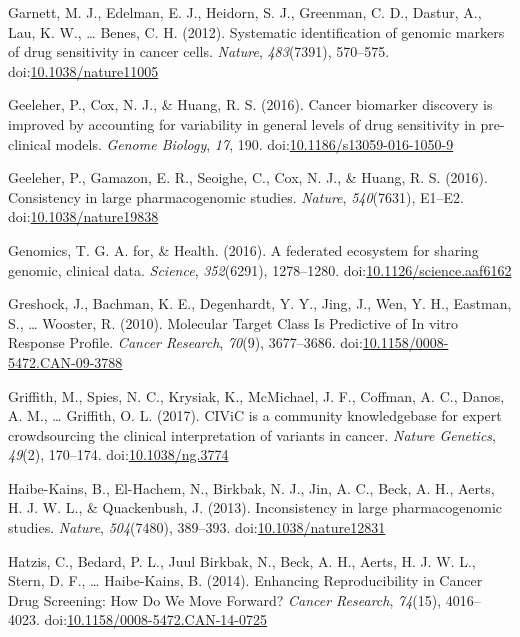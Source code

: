 \documentclass[man]{apa6}
\begin{document}
\hypertarget{ref-garnett2012}{}
Garnett, M. J., Edelman, E. J., Heidorn, S. J., Greenman, C. D., Dastur,
A., Lau, K. W., \ldots{} Benes, C. H. (2012). Systematic identification
of genomic markers of drug sensitivity in cancer cells. \emph{Nature},
\emph{483}(7391), 570--575.
doi:\href{https://doi.org/10.1038/nature11005}{10.1038/nature11005}

\hypertarget{ref-geeleher2016}{}
Geeleher, P., Cox, N. J., \& Huang, R. S. (2016). Cancer biomarker
discovery is improved by accounting for variability in general levels of
drug sensitivity in pre-clinical models. \emph{Genome Biology},
\emph{17}, 190.
doi:\href{https://doi.org/10.1186/s13059-016-1050-9}{10.1186/s13059-016-1050-9}

\hypertarget{ref-geeleher2016a}{}
Geeleher, P., Gamazon, E. R., Seoighe, C., Cox, N. J., \& Huang, R. S.
(2016). Consistency in large pharmacogenomic studies. \emph{Nature},
\emph{540}(7631), E1--E2.
doi:\href{https://doi.org/10.1038/nature19838}{10.1038/nature19838}

\hypertarget{ref-theglobalallianceforgenomicsandhealth2016}{}
Genomics, T. G. A. for, \& Health. (2016). A federated ecosystem for
sharing genomic, clinical data. \emph{Science}, \emph{352}(6291),
1278--1280.
doi:\href{https://doi.org/10.1126/science.aaf6162}{10.1126/science.aaf6162}

\hypertarget{ref-greshock2010}{}
Greshock, J., Bachman, K. E., Degenhardt, Y. Y., Jing, J., Wen, Y. H.,
Eastman, S., \ldots{} Wooster, R. (2010). Molecular Target Class Is
Predictive of In vitro Response Profile. \emph{Cancer Research},
\emph{70}(9), 3677--3686.
doi:\href{https://doi.org/10.1158/0008-5472.CAN-09-3788}{10.1158/0008-5472.CAN-09-3788}

\hypertarget{ref-griffith2017}{}
Griffith, M., Spies, N. C., Krysiak, K., McMichael, J. F., Coffman, A.
C., Danos, A. M., \ldots{} Griffith, O. L. (2017). CIViC is a community
knowledgebase for expert crowdsourcing the clinical interpretation of
variants in cancer. \emph{Nature Genetics}, \emph{49}(2), 170--174.
doi:\href{https://doi.org/10.1038/ng.3774}{10.1038/ng.3774}

\hypertarget{ref-haibe-kains2013}{}
Haibe-Kains, B., El-Hachem, N., Birkbak, N. J., Jin, A. C., Beck, A. H.,
Aerts, H. J. W. L., \& Quackenbush, J. (2013). Inconsistency in large
pharmacogenomic studies. \emph{Nature}, \emph{504}(7480), 389--393.
doi:\href{https://doi.org/10.1038/nature12831}{10.1038/nature12831}

\hypertarget{ref-hatzis2014}{}
Hatzis, C., Bedard, P. L., Juul Birkbak, N., Beck, A. H., Aerts, H. J.
W. L., Stern, D. F., \ldots{} Haibe-Kains, B. (2014). Enhancing
Reproducibility in Cancer Drug Screening: How Do We Move Forward?
\emph{Cancer Research}, \emph{74}(15), 4016--4023.
doi:\href{https://doi.org/10.1158/0008-5472.CAN-14-0725}{10.1158/0008-5472.CAN-14-0725}
\end{document}
